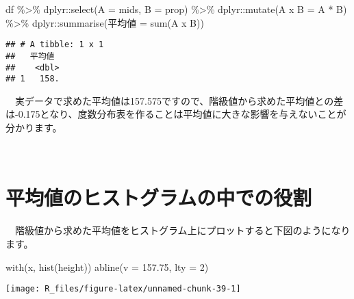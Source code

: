 \documentclass[
  12pt,
]{book}
\newenvironment{Shaded}{\begin{snugshade}}{\end{snugshade}}
\newcommand{\AttributeTok}[1]{\textcolor[rgb]{0.77,0.63,0.00}{#1}}
\newcommand{\DecValTok}[1]{\textcolor[rgb]{0.00,0.00,0.81}{#1}}
\newcommand{\FloatTok}[1]{\textcolor[rgb]{0.00,0.00,0.81}{#1}}
\newcommand{\FunctionTok}[1]{\textcolor[rgb]{0.00,0.00,0.00}{#1}}
\newcommand{\NormalTok}[1]{#1}
\newcommand{\OtherTok}[1]{\textcolor[rgb]{0.56,0.35,0.01}{#1}}
\newcommand{\SpecialCharTok}[1]{\textcolor[rgb]{0.00,0.00,0.00}{#1}}
\newcommand{\StringTok}[1]{\textcolor[rgb]{0.31,0.60,0.02}{#1}}
\begin{document}
\begin{Shaded}
\begin{Highlighting}[]
\NormalTok{df }\SpecialCharTok{\%\textgreater{}\%} 
\NormalTok{  dplyr}\SpecialCharTok{::}\FunctionTok{select}\NormalTok{(}\AttributeTok{A =}\NormalTok{ mids, }\AttributeTok{B =}\NormalTok{ prop) }\SpecialCharTok{\%\textgreater{}\%} 
\NormalTok{  dplyr}\SpecialCharTok{::}\FunctionTok{mutate}\NormalTok{(}\StringTok{\textasciigrave{}}\AttributeTok{A x B}\StringTok{\textasciigrave{}} \OtherTok{=}\NormalTok{ A }\SpecialCharTok{*}\NormalTok{ B) }\SpecialCharTok{\%\textgreater{}\%} 
\NormalTok{  dplyr}\SpecialCharTok{::}\FunctionTok{summarise}\NormalTok{(}\StringTok{\textasciigrave{}}\AttributeTok{平均値}\StringTok{\textasciigrave{}} \OtherTok{=} \FunctionTok{sum}\NormalTok{(}\StringTok{\textasciigrave{}}\AttributeTok{A x B}\StringTok{\textasciigrave{}}\NormalTok{))}
\end{Highlighting}
\end{Shaded}

\begin{verbatim}
## # A tibble: 1 x 1
##   平均値
##    <dbl>
## 1   158.
\end{verbatim}

　実データで求めた平均値は157.575ですので、階級値から求めた平均値との差は-0.175となり、度数分布表を作ることは平均値に大きな影響を与えないことが分かります。

　

\hypertarget{ux5e73ux5747ux5024ux306eux30d2ux30b9ux30c8ux30b0ux30e9ux30e0ux306eux4e2dux3067ux306eux5f79ux5272}{%
\section{平均値のヒストグラムの中での役割}\label{ux5e73ux5747ux5024ux306eux30d2ux30b9ux30c8ux30b0ux30e9ux30e0ux306eux4e2dux3067ux306eux5f79ux5272}}

　階級値から求めた平均値をヒストグラム上にプロットすると下図のようになります。

\begin{Shaded}
\begin{Highlighting}[]
\FunctionTok{with}\NormalTok{(x, }\FunctionTok{hist}\NormalTok{(height))}
\FunctionTok{abline}\NormalTok{(}\AttributeTok{v =} \FloatTok{157.75}\NormalTok{, }\AttributeTok{lty =} \DecValTok{2}\NormalTok{)}
\end{Highlighting}
\end{Shaded}

\begin{center}\texttt{[image: R\_files/figure-latex/unnamed-chunk-39-1]} \end{center}
\end{document}
